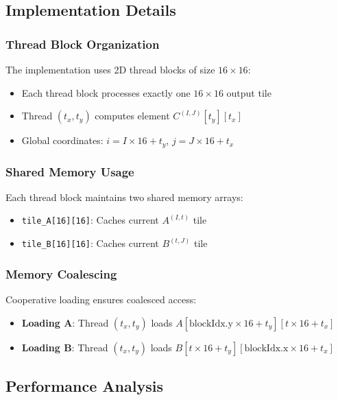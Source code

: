 \documentclass{amsbook}
\theoremstyle{definition}
\begin{document}
\subsection{Implementation Details}

\subsubsection{Thread Block Organization}

The implementation uses 2D thread blocks of size $16 \times 16$:
\begin{itemize}
\item Each thread block processes exactly one $16 \times 16$ output tile
\item Thread $(t_x, t_y)$ computes element $C^{(I,J)}[t_y][t_x]$
\item Global coordinates: $i = I \times 16 + t_y$, $j = J \times 16 + t_x$
\end{itemize}

\subsubsection{Shared Memory Usage}

Each thread block maintains two shared memory arrays:
\begin{itemize}
\item \texttt{tile\_A[16][16]}: Caches current $A^{(I,t)}$ tile
\item \texttt{tile\_B[16][16]}: Caches current $B^{(t,J)}$ tile
\end{itemize}

\subsubsection{Memory Coalescing}

Cooperative loading ensures coalesced access:
\begin{itemize}
\item \textbf{Loading A}: Thread $(t_x, t_y)$ loads $A[\text{blockIdx.y} \times 16 + t_y][t \times 16 + t_x]$
\item \textbf{Loading B}: Thread $(t_x, t_y)$ loads $B[t \times 16 + t_y][\text{blockIdx.x} \times 16 + t_x]$
\end{itemize}

\subsection{Performance Analysis}
\end{document}
